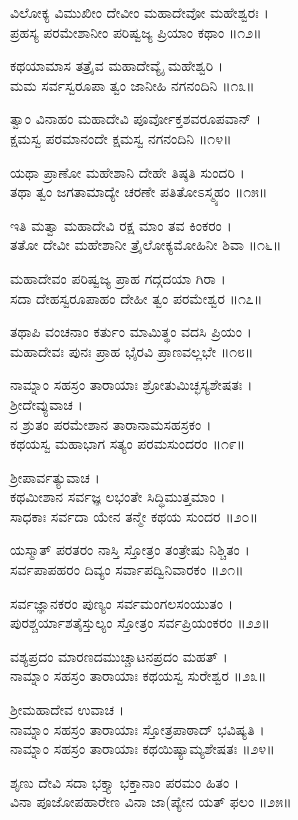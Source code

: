 ವಿಲೋಕ್ಯ ವಿಮುಖೀಂ ದೇವೀಂ ಮಹಾದೇವೋ ಮಹೇಶ್ವರಃ ।\\
ಪ್ರಹಸ್ಯ ಪರಮೇಶಾನೀಂ ಪರಿಷ್ವಜ್ಯ ಪ್ರಿಯಾಂ ಕಥಾಂ ॥೧೨॥

ಕಥಯಾಮಾಸ ತತ್ರೈವ ಮಹಾದೇವ್ಯೈ ಮಹೇಶ್ವರಿ ।\\
ಮಮ ಸರ್ವಸ್ವರೂಪಾ ತ್ವಂ ಜಾನೀಹಿ ನಗನಂದಿನಿ ॥೧೩॥

ತ್ವಾಂ ವಿನಾಹಂ ಮಹಾದೇವಿ ಪೂರ್ವೋಕ್ತಶವರೂಪವಾನ್ ।\\
ಕ್ಷಮಸ್ವ ಪರಮಾನಂದೇ ಕ್ಷಮಸ್ವ ನಗನಂದಿನಿ ॥೧೪॥

ಯಥಾ ಪ್ರಾಣೋ ಮಹೇಶಾನಿ ದೇಹೇ ತಿಷ್ಠತಿ ಸುಂದರಿ ।\\
ತಥಾ ತ್ವಂ ಜಗತಾಮಾದ್ಯೇ ಚರಣೇ ಪತಿತೋಽಸ್ಮ್ಯಹಂ ॥೧೫॥

ಇತಿ ಮತ್ವಾ ಮಹಾದೇವಿ ರಕ್ಷ ಮಾಂ ತವ ಕಿಂಕರಂ ।\\
ತತೋ ದೇವೀ ಮಹೇಶಾನೀ ತ್ರೈಲೋಕ್ಯಮೋಹಿನೀ ಶಿವಾ ॥೧೬॥

ಮಹಾದೇವಂ ಪರಿಷ್ವಜ್ಯ ಪ್ರಾಹ ಗದ್ಗದಯಾ ಗಿರಾ ।\\
ಸದಾ ದೇಹಸ್ವರೂಪಾಹಂ ದೇಹೀ ತ್ವಂ ಪರಮೇಶ್ವರ ॥೧೭॥

ತಥಾಪಿ ವಂಚನಾಂ ಕರ್ತುಂ ಮಾಮಿತ್ಥಂ ವದಸಿ ಪ್ರಿಯಂ ।\\
ಮಹಾದೇವಃ ಪುನಃ ಪ್ರಾಹ ಭೈರವಿ ಪ್ರಾಣವಲ್ಲಭೇ ॥೧೮॥

ನಾಮ್ನಾಂ ಸಹಸ್ರಂ ತಾರಾಯಾಃ ಶ್ರೋತುಮಿಚ್ಛಸ್ಯಶೇಷತಃ ।\\

ಶ್ರೀದೇವ್ಯುವಾಚ ।\\
ನ ಶ್ರುತಂ ಪರಮೇಶಾನ ತಾರಾನಾಮಸಹಸ್ರಕಂ ।\\
ಕಥಯಸ್ವ ಮಹಾಭಾಗ ಸತ್ಯಂ ಪರಮಸುಂದರಂ ॥೧೯॥

ಶ್ರೀಪಾರ್ವತ್ಯುವಾಚ ।\\
ಕಥಮೀಶಾನ ಸರ್ವಜ್ಞ ಲಭಂತೇ ಸಿದ್ಧಿಮುತ್ತಮಾಂ ।\\
ಸಾಧಕಾಃ ಸರ್ವದಾ ಯೇನ ತನ್ಮೇ ಕಥಯ ಸುಂದರ ॥೨೦॥

ಯಸ್ಮಾತ್ ಪರತರಂ ನಾಸ್ತಿ ಸ್ತೋತ್ರಂ ತಂತ್ರೇಷು ನಿಶ್ಚಿತಂ ।\\
ಸರ್ವಪಾಪಹರಂ ದಿವ್ಯಂ ಸರ್ವಾಪದ್ವಿನಿವಾರಕಂ ॥೨೧॥

ಸರ್ವಜ್ಞಾನಕರಂ ಪುಣ್ಯಂ ಸರ್ವಮಂಗಲಸಂಯುತಂ ।\\
ಪುರಶ್ಚರ್ಯಾಶತೈಸ್ತುಲ್ಯಂ ಸ್ತೋತ್ರಂ ಸರ್ವಪ್ರಿಯಂಕರಂ ॥೨೨॥

ವಶ್ಯಪ್ರದಂ ಮಾರಣದಮುಚ್ಚಾಟನಪ್ರದಂ ಮಹತ್ ।\\
ನಾಮ್ನಾಂ ಸಹಸ್ರಂ ತಾರಾಯಾಃ ಕಥಯಸ್ವ ಸುರೇಶ್ವರ ॥೨೩॥

ಶ್ರೀಮಹಾದೇವ ಉವಾಚ ।\\
ನಾಮ್ನಾಂ ಸಹಸ್ರಂ ತಾರಾಯಾಃ ಸ್ತೋತ್ರಪಾಠಾದ್ ಭವಿಷ್ಯತಿ ।\\
ನಾಮ್ನಾಂ ಸಹಸ್ರಂ ತಾರಾಯಾಃ ಕಥಯಿಷ್ಯಾಮ್ಯಶೇಷತಃ ॥೨೪॥

ಶೃಣು ದೇವಿ ಸದಾ ಭಕ್ತ್ಯಾ ಭಕ್ತಾನಾಂ ಪರಮಂ ಹಿತಂ ।\\
ವಿನಾ ಪೂಜೋಪಹಾರೇಣ ವಿನಾ ಜಾ(ಪ್ಯೇನ ಯತ್ ಫಲಂ ॥೨೫॥

